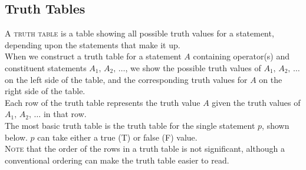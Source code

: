 \documentclass{article}
\begin{document}
\subsection{\sc Truth Tables}
A \textsc{truth table} is a table showing all possible truth values for a statement, depending upon the statements that make it up.\\[1ex]
When we construct a truth table for a statement $A$ containing operator(s) and constituent statements $A_1,\,A_2,\,\ldots$, we show the possible truth values of $A_1,\,A_2,\,\ldots$ on the left side of the table, and the corresponding truth values for $A$ on the right side of the table.\\
Each row of the truth table represents the truth value $A$ given the truth values of $A_1,\,A_2,\,\ldots$ in that row. \\[1ex]
The most basic truth table is the truth table for the single statement $p$, shown below. $p$ can take either a true (T) or false (F) value.\\[1ex]
\textsc{Note} that the order of the rows in a truth table is not significant, although a conventional ordering can make the truth table easier to read.
\end{document}
